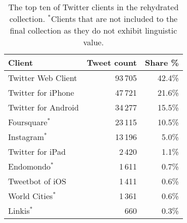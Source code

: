 \begin{table}[ht]
  \centering
  \begin{tabular}{lrr}
    \toprule
    Client & Tweet count & Share \% \\
    \midrule
    Twitter Web Client     & 93\,705 &    42.4\% \\
    Twitter for iPhone     & 47\,721 &    21.6\% \\
    Twitter for Android    & 34\,277 &    15.5\% \\
    Foursquare$^*$             & 23\,115 &    10.5\% \\
    Instagram$^*$               & 13\,196 &     5.0\% \\
    Twitter for iPad       & 2\,420  &     1.1\% \\
    Endomondo$^*$               & 1\,611  &     0.7\% \\
    Tweetbot of iOS        & 1\,411  &     0.6\% \\
    World Cities$^*$            & 1\,361  &     0.6\% \\
    Linkis$^*$                  &  660  &     0.3\% \\
    \bottomrule
  \end{tabular}
  \caption{The top ten of Twitter clients in the rehydrated collection. $^*$Clients
    that are not included to the final collection as they do not exhibit
    linguistic value.}
  \label{tab:client-counts}
\end{table}